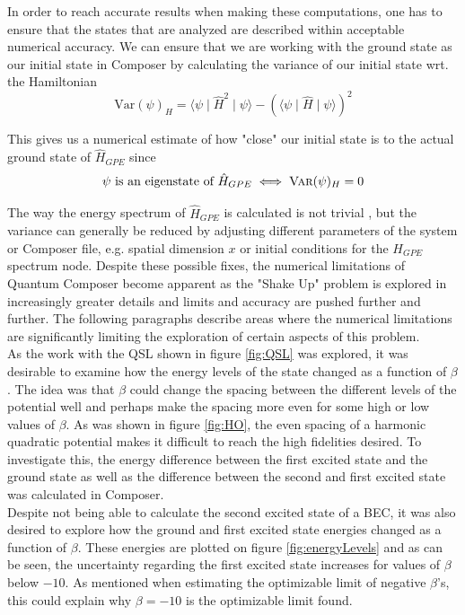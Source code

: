 \documentclass[a4paper, twocolumn]{revtex4-1}
\begin{document}
In order to reach accurate results when making these computations, one has to ensure that the states that are analyzed are described within acceptable numerical accuracy. We can ensure that we are working with the ground state as our initial state in Composer by calculating the variance of our initial state wrt. the Hamiltonian
\begin{equation}
	\text{Var}(\psi)_H = \langle \psi \mid \hat{H}^2 \mid \psi \rangle - (\langle \psi \mid \hat{H} \mid \psi \rangle)^2
\end{equation}

This gives us a numerical estimate of how "close" our initial state is to the actual ground state of $\hat{H}_{GPE}$ since
\begin{equation}
	\psi \text{ is an eigenstate of } \hat{H}_{GPE} \iff \textsc{Var}(\psi)_H = 0
\end{equation}

The way the energy spectrum of $\hat{H}_{GPE}$ is calculated is not trivial \cite{QEngine}, but the variance can generally be reduced by adjusting different parameters of the system or Composer file, e.g. spatial dimension $x$ or initial conditions for the $H_{GPE}$ spectrum node. Despite these possible fixes, the numerical limitations of Quantum Composer become apparent as the "Shake Up" problem is explored in increasingly greater details and limits and accuracy are pushed further and further. The following paragraphs describe areas where the numerical limitations are significantly limiting the exploration of certain aspects of this problem.\\

As the work with the QSL shown in figure \ref{fig:QSL} was explored, it was desirable to examine how the energy levels of the state changed as a function of $\beta$. The idea was that $\beta$ could change the spacing between the different levels of the potential well and perhaps make the spacing more even for some high or low values of $\beta$. As was shown in figure \ref{fig:HO}, the even spacing of a harmonic quadratic potential makes it difficult to reach the high fidelities desired. To investigate this, the energy difference between the first excited state and the ground state as well as the difference between the second and first excited state was calculated in Composer.\\

Despite not being able to calculate the second excited state of a BEC, it was also desired to explore how the ground and first excited state energies changed as a function of $\beta$. These energies are plotted on figure \ref{fig:energyLevels} and as can be seen, the uncertainty regarding the first excited state increases for values of $\beta$ below $-10$. As mentioned when estimating the optimizable limit of negative $\beta$'s, this could explain why $\beta=-10$ is the optimizable limit found.\\
\end{document}
